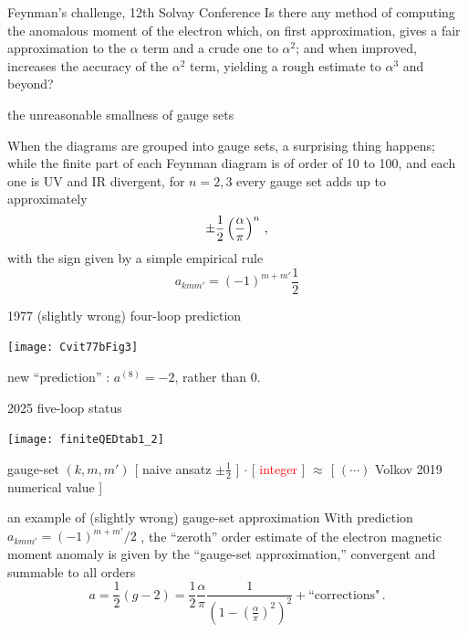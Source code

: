 \begin{frame}{Feynman's challenge, 12th Solvay Conference}
Is there any method of computing the anomalous moment of the
electron which, on first approximation, gives a fair approximation to the
$\alpha$ term and a crude one to $\alpha^2$; and when improved, increases
the accuracy of the $\alpha^2$ term, yielding a rough estimate to
$\alpha^3$ and beyond?
\end{frame}

\begin{frame}{the unreasonable smallness of gauge sets}

When the diagrams are grouped into
gauge sets,
a surprising thing happens; while the
finite part of each Feynman diagram is of order of 10 to 100,
and each one is UV and IR divergent, for $n=2,3$
every gauge set adds up to approximately
\[
		   \pm {1 \over 2} \left(\frac{\alpha}{\pi}\right)^n
\,,
\]
with the sign given by a simple empirical rule
\[
a_{kmm'} = (-1)^{m+m'}\frac{1}{2}
\] %
\end{frame}


\begin{frame}{1977 (slightly wrong) four-loop prediction}
\begin{center}
\texttt{[image: Cvit77bFig3]}
\end{center}

{\scriptsize  %
new ``prediction'' : $a^{(8)}=-2$, rather than 0.
}
\end{frame}

\begin{frame}{2025 five-loop status}
\begin{center}
\texttt{[image: finiteQEDtab1\_2]}
\end{center}


\begin{block} {gauge-set $(k,m,m')$}
{\scriptsize
[ naive ansatz $\pm\frac{1}{2}$ ] $\cdot$
[ \textcolor{red}{integer} ] $\approx$ %
[ $(\cdots)$ Volkov 2019 numerical value ]
            } %
\end{block}
\end{frame}


\begin{frame}{an example of (slightly wrong) gauge-set approximation}
With prediction \(
a_{kmm'} = (-1)^{m+m'}\!/2
\) %
, the ``zeroth'' order estimate of the electron
magnetic moment anomaly is given by the ``gauge-set
approximation,'' convergent and summable to all orders
\[ %
a=\frac{1}{2}(g-2) =  \frac{1}{2} \frac{\alpha}{\pi}
                     \frac{1}
           {\left( 1 - \left(\frac{\alpha}{\pi}\right)^2
			\right)^2
		      } + \mbox{``corrections"}
\,.
\] %
\end{frame}

